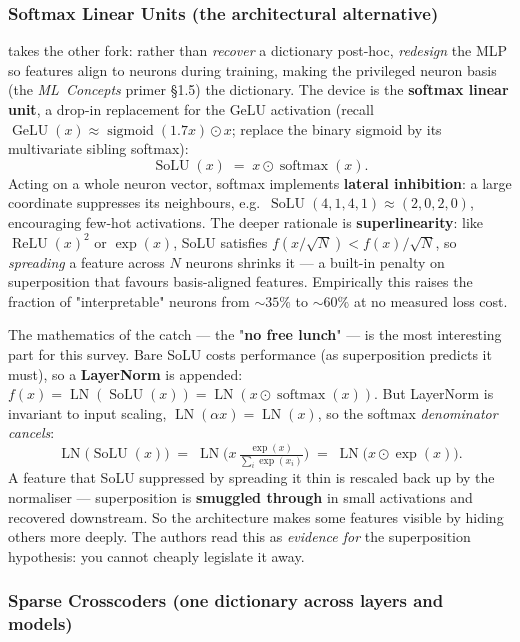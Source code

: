 \subsubsection*{Softmax Linear Units (the architectural alternative)}

\textcite{softmax-linear-units} takes the other fork: rather than \emph{recover} a dictionary post-hoc, \emph{redesign} the MLP so features align to neurons during training, making the privileged neuron basis (the \emph{ML~Concepts} primer §1.5) the dictionary. The device is the \textbf{softmax linear unit}, a drop-in replacement for the GeLU activation (recall $\operatorname{GeLU}(x)\approx\operatorname{sigmoid}(1.7x)\odot x$; replace the binary sigmoid by its multivariate sibling softmax):
\[
\operatorname{SoLU}(x)\;=\;x\odot\operatorname{softmax}(x).
\]
Acting on a whole neuron vector, softmax implements \textbf{lateral inhibition}: a large coordinate suppresses its neighbours, e.g.\ $\operatorname{SoLU}(4,1,4,1)\approx(2,0,2,0)$, encouraging few-hot activations. The deeper rationale is \textbf{superlinearity}: like $\operatorname{ReLU}(x)^2$ or $\exp(x)$, SoLU satisfies $f(x/\sqrt{N})<f(x)/\sqrt{N}$, so \emph{spreading} a feature across $N$ neurons shrinks it --- a built-in penalty on superposition that favours basis-aligned features. Empirically this raises the fraction of "interpretable" neurons from $\sim\!35\%$ to $\sim\!60\%$ at no measured loss cost.

The mathematics of the catch --- the "\textbf{no free lunch}" --- is the most interesting part for this survey. Bare SoLU costs performance (as superposition predicts it must), so a \textbf{LayerNorm} is appended: $f(x)=\operatorname{LN}(\operatorname{SoLU}(x))=\operatorname{LN}(x\odot\operatorname{softmax}(x))$. But LayerNorm is invariant to input scaling, $\operatorname{LN}(\alpha x)=\operatorname{LN}(x)$, so the softmax \emph{denominator cancels}:
\[
\operatorname{LN}\!\big(\operatorname{SoLU}(x)\big)\;=\;\operatorname{LN}\!\Big(x\,\tfrac{\exp(x)}{\sum_i\exp(x_i)}\Big)\;=\;\operatorname{LN}\!\big(x\odot\exp(x)\big).
\]
A feature that SoLU suppressed by spreading it thin is rescaled back up by the normaliser --- superposition is \textbf{smuggled through} in small activations and recovered downstream. So the architecture makes some features visible by hiding others more deeply. The authors read this as \emph{evidence for} the superposition hypothesis: you cannot cheaply legislate it away.

\subsubsection*{Sparse Crosscoders (one dictionary across layers and models)}

